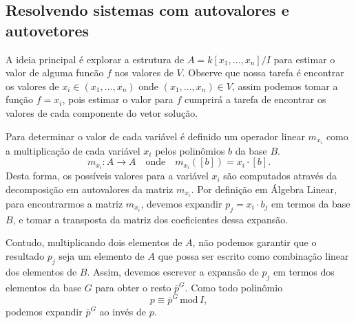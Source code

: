 \subsection{Resolvendo sistemas com autovalores e autovetores}

A ideia principal é explorar a estrutura de $A=k[x_1,...,x_n]/I$ para estimar o valor de alguma funcão $f$ nos valores de $V$. Observe que nossa tarefa é encontrar os valores de $x_i\in (x_1,...,x_n)$ onde $(x_1,...,x_n)\in V$, assim podemos tomar a função $f=x_i$, pois estimar o valor para $f$ cumprirá a tarefa de encontrar os valores de cada componente do vetor solução.

Para determinar o valor de cada variável é definido um operador linear $m_{x_i}$ como a multiplicação de cada variável $x_i$ pelos polinômios $b$ da base $B$.
\begin{equation*}
m_{x_i}:A\rightarrow A\quad\text{onde}\quad m_{x_i}([b])=x_i\cdot[b].
\end{equation*} 
Desta forma, os possíveis valores para a variável $x_i$ são computados através da decomposição em autovalores da matriz $m_{x_i}$. Por definição em Álgebra Linear, para encontrarmos a matriz $m_{x_i}$,  devemos expandir $p_j=x_i\cdot b_j$ em termos da base $B$, e tomar a transposta da matriz dos coeficientes dessa expansão.

Contudo, multiplicando dois elementos de $A$, não podemos garantir que o resultado $p_j$ seja um elemento de $A$ que possa ser escrito como combinação linear dos elementos de $B$. Assim, devemos escrever a expansão de $p_j$ em termos dos elementos da base $G$ para obter o resto $\overline{p}^{G}$. Como todo polinômio
\begin{equation}\label{eq.resto-mod}
p\equiv\overline{p}^{G}\,\text{mod}\,I,
\end{equation} 
podemos expandir $\overline{p}^{G}$ ao invés de $p$. 

